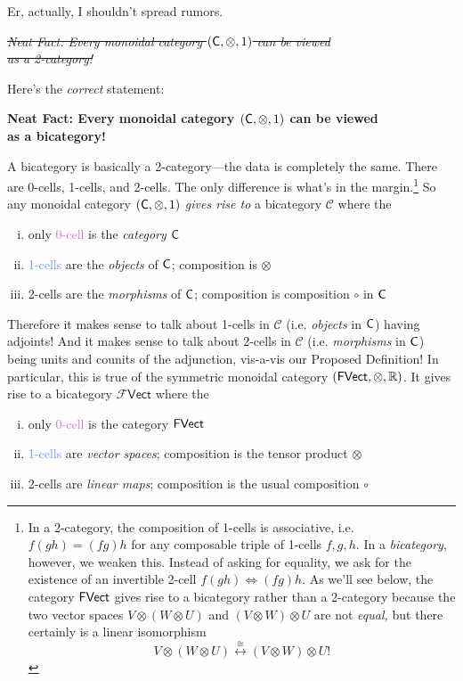 \documentclass{tufte-handout-tai}
\newcommand{\cat}[1]{{\normalfont\textsf{#1}}}
\theoremstyle{plain}
\theoremstyle{definition}
\theoremstyle{remark}
\begin{document}
\noindent Er, actually, I shouldn't spread rumors. 

\begin{center}
\noindent \sout{\textit{Neat Fact: Every monoidal category $(\cat{C},\otimes,1)$ can be viewed}}\\\sout{\textit{as a 2-category!}}
\end{center}

\noindent Here's the \textit{correct} statement:


\begin{center}
\noindent \textbf{Neat Fact: Every monoidal category $(\cat{C},\otimes,1)$ can be viewed\\as a bicategory!}
\end{center}

\noindent A bicategory is basically a 2-category---the data is completely the same. There are 0-cells, 1-cells, and 2-cells. The only difference is what's in the margin.\footnote[][-3cm]{In a 2-category, the composition of 1-cells is associative, i.e. $f(gh)=(fg)h$ for any composable triple of 1-cells $f,g,h.$ In a \textit{bicategory}, however, we weaken this. Instead of asking for equality, we ask for the existence of an invertible 2-cell  $f(gh)\Longleftrightarrow (fg)h$. As we'll see below, the category $\cat{FVect}$ gives rise to a bicategory rather than a 2-category because the two vector spaces $V\otimes (W\otimes U)$ and $(V\otimes W)\otimes U$ are not \textit{equal,} but there certainly is a linear isomorphism \[V\otimes (W\otimes U)\overset{\cong}{\longleftrightarrow} (V\otimes W)\otimes U!\] }
So any monoidal category $(\cat{C},\otimes,1)$ \textit{gives rise to} a bicategory $\mathcal{C}$ where the
\begin{enumerate}[i.]
\item only \textcolor{Orchid}{0-cell} is the \textit{category} $\cat{C}$
\item \textcolor{CornflowerBlue}{1-cells} are the \textit{objects} of $\cat{C}$; composition is  $\otimes$
\item \textcolor{Melon}{2-cells} are the \textit{morphisms} of $\cat{C}$; composition is composition $\circ$ in $\cat{C}$
\end{enumerate}
Therefore it makes sense to talk about 1-cells in $\mathcal{C}$ (i.e. \textit{objects} in $\cat{C}$) having adjoints! And it makes sense to talk about 2-cells in $\mathcal{C}$ (i.e. \textit{morphisms} in $\cat{C}$) being units and counits of the adjunction, vis-a-vis our Proposed Definition! In particular, this is true of the symmetric monoidal category $(\cat{FVect},\otimes,\mathbb{R})$. It gives rise to a bicategory $\mathcal{F}\mathsf{Vect}$ where the
\begin{enumerate}[i.]
\item only \textcolor{Orchid}{0-cell} is the category $\cat{FVect}$ 
\item \textcolor{CornflowerBlue}{1-cells} are \textit{vector spaces}; composition is the tensor product $\otimes$
\item \textcolor{Melon}{2-cells} are \textit{linear maps}; composition is the usual composition $\circ$
\end{enumerate}
\end{document}
